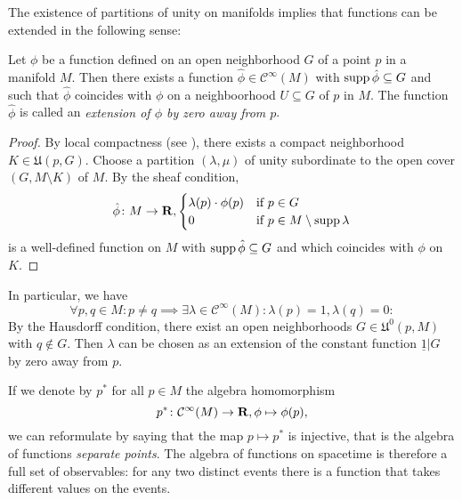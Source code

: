 The existence of partitions of unity on manifolds implies that functions can
be extended in the following sense:

\begin{cor}
  Let $\phi$ be a function defined on an open
  neighborhood $G$ of a point $p$
  in a manifold $M$. Then there exists a function $\hat \phi \in \mathcal C^\infty(M)$
  with $\operatorname{supp} \hat\phi \subseteq G$ and
  such that $\hat \phi$ coincides with $\phi$ on a neighboorhood $U \subseteq G$
  of $p$ in $M$. The function $\hat \phi$ is called an \emph{extension of $\phi$
  by zero away from $p$}.
\end{cor}

\begin{proof}
  By local compactness (see ),
  there exists a compact neighborhood $K \in \mathfrak U(p, G)$.
  Choose a partition $(\lambda, \mu)$ of unity subordinate to the open cover
  $(G, M \setminus K)$ of $M$. By the sheaf condition,
  \[
    \hat\phi\colon M \to \mathbf{R},
    \begin{cases}
      \lambda(p) \cdot \phi(p) & \text{if $p \in G$} \\
      0 & \text{if $p \in M \setminus \operatorname{supp} \lambda$}
    \end{cases}
  \]
  is a well-defined function on $M$ with $\operatorname{supp} \hat\phi \subseteq G$ and
  which coincides with $\phi$ on $K$.
\end{proof}

In particular, we have
\begin{equation}
  \label{eq:point_separation}
  \forall p, q \in M : p \neq q \implies
  \exists \lambda \in \mathcal C^\infty(M) : \lambda(p) = 1, \lambda(q) = 0:
\end{equation}
By the Hausdorff
condition, there exist an open neighborhoods $G \in \mathfrak U^0(p, M)$
with $q \notin G$. Then $\lambda$ can be chosen as an extension of the constant
function $\underline 1|G$ by zero away from $p$.

If we denote by $p^*$ for all $p \in M$ the algebra homomorphism
\begin{equation}
  p^*\colon \mathcal C^\infty(M) \to \mathbf{R}, \phi \mapsto \phi(p),
\end{equation}
we can reformulate  by saying that the map $p \mapsto p^*$ is injective,
that is the algebra of functions \emph{separate points}. The algebra of functions
on spacetime is therefore a full set of observables: for any two distinct events
there is a function that takes different values on the events.

